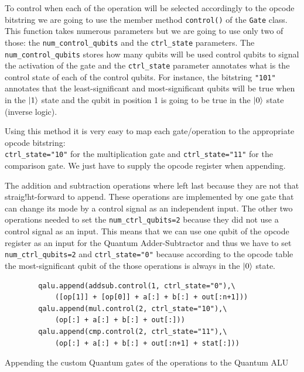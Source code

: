 To control when each of the operation will be selected accordingly to the opcode bitstring we are going to use the member
method \verb|control()| of the \verb|Gate| class. This function takes numerous parameters but we are going to use only
two of those: the \verb|num_control_qubits| and the \verb|ctrl_state| parameters. The \verb|num_control_qubits| stores
how many qubits will be used control qubits to signal the activation of the gate and the \verb|ctrl_state| parameter
annotates what is the control state of each of the control qubits. For instance, the bitstring \verb|"101"| annotates
that the least-significant and most-significant qubits will be true when in the $\ket{1}$ state and the qubit in position
1 is going to be true in the $\ket{0}$ state (inverse logic).

Using this method it is very easy to map each gate/operation to the appropriate opcode bitstring: \\\verb|ctrl_state="10"| for
the multiplication gate and \verb|ctrl_state="11"| for the comparison gate. We just have to supply the opcode register
when appending.

The addition and subtraction operations where left last because they are not that straig!ht-forward to append. These operations are
implemented by one gate that can change its mode by a control signal as an independent input. The other two operations needed
to set the \verb|num_ctrl_qubits=2| because they did not use a control signal as an input. This means that we can use one qubit
of the opcode register as an input for the Quantum Adder-Subtractor and thus we have to set \verb|num_ctrl_qubits=2| and
\verb|ctrl_state="0"| because according to the opcode table the most-significant qubit of the those operations is always in the
$\ket{0}$ state.

\begin{listing}[!ht]
    \begin{verbatim}
        qalu.append(addsub.control(1, ctrl_state="0"),\
            ([op[1]] + [op[0]] + a[:] + b[:] + out[:n+1]))
        qalu.append(mul.control(2, ctrl_state="10"),\
            (op[:] + a[:] + b[:] + out[:]))
        qalu.append(cmp.control(2, ctrl_state="11"),\
            (op[:] + a[:] + b[:] + out[:n+1] + stat[:]))
    \end{verbatim}
    \caption{Appending the custom Quantum gates of the operations to the Quantum ALU}
\end{listing}


